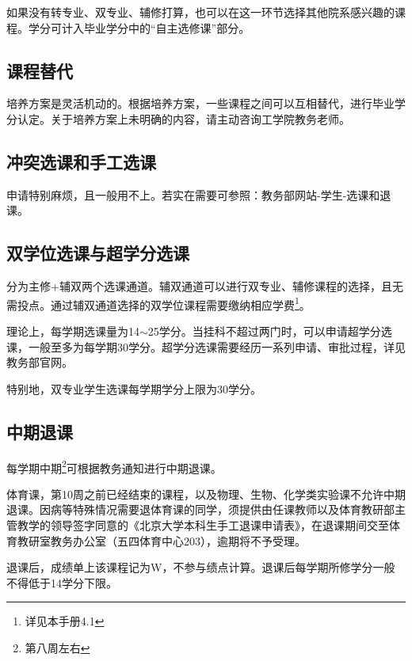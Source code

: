 \documentclass[11pt,oneside]{book}
\begin{document}
\vspace{10pt}

如果没有转专业、双专业、辅修打算，也可以在这一环节选择其他院系感兴趣的课程。学分可计入毕业学分中的“自主选修课”部分。

\subsection{课程替代}
培养方案是灵活机动的。根据培养方案，一些课程之间可以互相替代，进行毕业学分认定。关于培养方案上未明确的内容，请主动咨询工学院教务老师。

\subsection{冲突选课和手工选课}
申请特别麻烦，且一般用不上。若实在需要可参照：教务部网站-学生-选课和退课。

\subsection{双学位选课与超学分选课}
分为主修+辅双两个选课通道。辅双通道可以进行双专业、辅修课程的选择，且无需投点。通过辅双通道选择的双学位课程需要缴纳相应学费\footnote{详见本手册4.1}。

\vspace{10pt}

理论上，每学期选课量为14$\sim$25学分。当挂科不超过两门时，可以申请超学分选课，一般至多为每学期30学分。超学分选课需要经历一系列申请、审批过程，详见教务部官网。

\vspace{10pt}

特别地，双专业学生选课每学期学分上限为30学分。

\subsection{中期退课}
每学期中期\footnote{第八周左右}可根据教务通知进行中期退课。

\vspace{10pt}

体育课，第10周之前已经结束的课程，以及物理、生物、化学类实验课不允许中期退课。因病等特殊情况需要退体育课的同学，须提供由任课教师以及体育教研部主管教学的领导签字同意的《北京大学本科生手工退课申请表》，在退课期间交至体育教研室教务办公室（五四体育中心203），逾期将不予受理。

\vspace{10pt}

退课后，成绩单上该课程记为W，不参与绩点计算。退课后每学期所修学分一般不得低于14学分下限。
\end{document}
